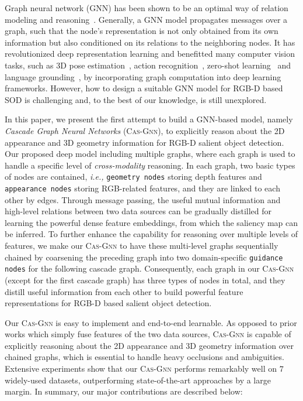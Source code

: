 \documentclass[runningheads]{llncs}
\begin{document}
Graph neural network ({{GNN}}) has been shown to be an optimal way of relation modeling and reasoning~\cite{Shen_2018_ECCV,Chen_2019_CVPR,Zhao_2019_CVPR1,xu2018powerful,Wang_2019_ICCV}. Generally, a GNN model propagates messages over a graph, such that the node's representation is not only obtained from its own information but also conditioned on its relations to the neighboring nodes. It has revolutionized deep representation learning and benefitted many computer vision tasks, such as 3D pose estimation~\cite{Cai_2019_ICCV}, action recognition~\cite{Zhao_2019_ICCV_graph}, zero-shot learning~\cite{xie2020} and language grounding~\cite{Bajaj_2019_ICCV}, by incorporating graph computation into deep learning frameworks. However, how to design a suitable GNN model for RGB-D based SOD is challenging and, to the best of our knowledge, is still unexplored.	

In this paper, we present the first attempt to build a GNN-based model, namely {\em Cascade Graph Neural Networks} ({\scshape{Cas-Gnn}}), to explicitly reason about the 2D appearance and 3D geometry information for RGB-D salient object detection. Our proposed deep model including multiple graphs, where each graph is used to handle a specific level of \emph{cross-modality} reasoning.  In each graph, two basic types of nodes are contained, \emph{i.e.,} {\tt geometry nodes} storing depth features and  {\tt appearance nodes} storing RGB-related features, and they are linked to each other by edges. Through message passing, the useful mutual information and high-level relations between two data sources can be gradually distilled for learning the powerful dense feature embeddings, from which the saliency map can be inferred. To further enhance the capability for reasoning over multiple levels of features, we make our {\scshape{Cas-Gnn}} to have these multi-level graphs sequentially chained by coarsening the preceding graph into two domain-specific {\tt guidance nodes} for the following cascade graph. Consequently, each graph in our {\scshape{Cas-Gnn}} (except for the first cascade graph) has three types of nodes in total, and they distill useful information from each other to build powerful feature representations for RGB-D based salient object detection. 

Our {\scshape{Cas-Gnn}} is easy to implement and end-to-end learnable.  As opposed to prior works which simply fuse features of the two data sources, {\scshape{Cas-Gnn}} is capable of explicitly reasoning about the 2D appearance and 3D geometry information over chained graphs, which is essential to handle heavy occlusions and ambiguities. Extensive experiments show that our {\scshape{Cas-Gnn}} performs remarkably well on $7$ widely-used datasets, outperforming state-of-the-art approaches by a large margin. In summary, our major contributions are described below:
\end{document}
